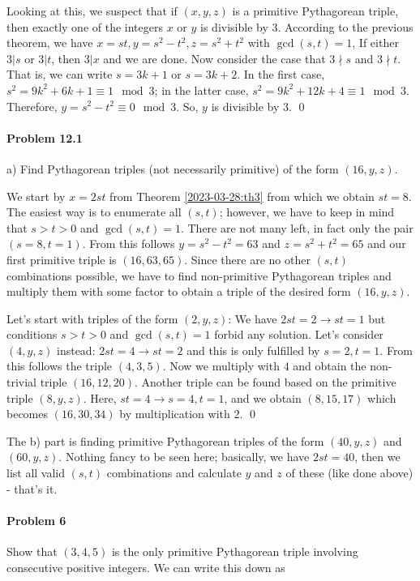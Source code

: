 Looking at this, we suspect that if $(x , y, z)$ is a primitive Pythagorean triple, then exactly one of the integers $x$ or $y$ is divisible by $3$. According to the previous theorem, we have $x=st, y=s^2-t^2, z=s^2+t^2$ with $\gcd(s,t)=1$, If either $3|s$ or $3|t$, then $3|x$ and we are done. Now consider the case that $3 \nmid s$ and $3 \nmid t$. That is, we can write $s = 3k+1$ or $s=3k+2$. In the first case, $s^2 =  9k^2 + 6k + 1 \equiv 1 \mod 3$; in the latter case, $s^2 = 9k^2 + 12k + 4 \equiv 1 \mod 3$. Therefore, $y = s^2 - t^2 \equiv 0 \mod 3$. So, $y$ is divisible by $3$. \qed

\paragraph{Problem 12.1} a) Find Pythagorean triples (not necessarily primitive) of the form $(16,y,z)$.

We start by $x= 2st$ from Theorem \ref{2023-03-28:th3} from which we obtain $st = 8$. The easiest way is to enumerate all $(s,t)$; however, we have to keep in mind that $s > t > 0$ and $\gcd(s,t) = 1$. There are not many left, in fact only the pair $(s=8, t=1)$. From this follows $y = s^2 - t^2 = 63$ and $z = s^2 + t^2 = 65$ and our first primitive triple is $(16, 63, 65)$. Since there are no other $(s,t)$ combinations possible, we have to find non-primitive Pythagorean triples and multiply them with some factor to obtain a triple of the desired form $(16, y, z)$.

Let's start with triples of the form $(2, y, z)$: We have $2st = 2 \rightarrow st = 1$ but conditions $s > t > 0$ and $\gcd(s,t) = 1$ forbid any solution. Let's consider $(4, y, z)$ instead: $2st = 4 \rightarrow st = 2$ and this is only fulfilled by $s = 2, t=1$. From this follows the triple $(4,3,5)$. Now we multiply with $4$ and obtain the non-trivial triple $(16, 12, 20)$. Another triple can be found based on the primitive triple $(8, y, z)$. Here, $st=4 \rightarrow s = 4, t=1$, and we obtain $(8, 15, 17)$ which becomes $(16, 30, 34)$ by multiplication with $2$. \qed

The b) part is finding primitive Pythagorean triples of the form $(40,y,z)$ and $(60,y,z)$. Nothing fancy to be seen here; basically, we have $2st = 40$, then we list all valid $(s,t)$ combinations and calculate $y$ and $z$ of these (like done above) - that's it.

\paragraph{Problem 6} Show that $(3,4,5)$ is the only primitive Pythagorean triple involving consecutive positive integers. We can write this down as

